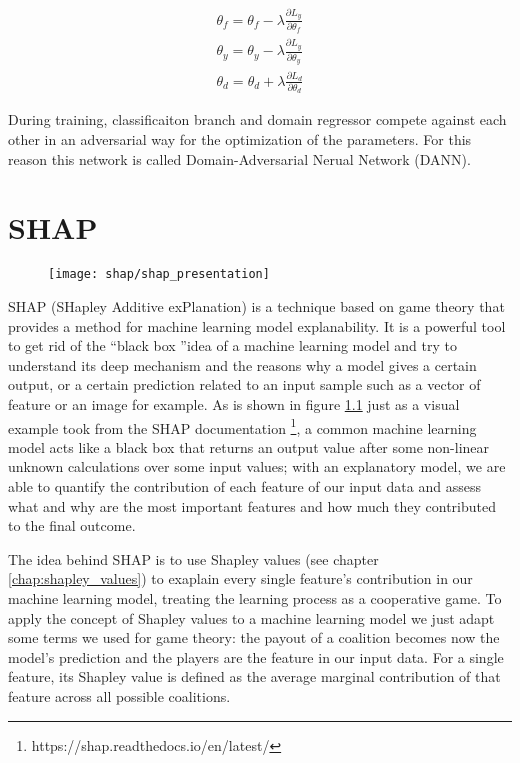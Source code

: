 \documentclass[11pt]{report}
\begin{document}
\begin{equation}
\begin{split}
 \theta_f = \theta_f - \lambda \frac{\partial L_y}{\partial \theta_f} \\
 \theta_y = \theta_y - \lambda \frac{\partial L_y}{\partial \theta_y} \\
\theta_d = \theta_d + \lambda \frac{\partial L_d}{\partial \theta_d}
\end{split}
\end{equation}

During training, classificaiton branch and domain regressor compete against each other in an adversarial way for the optimization of the parameters. For this reason this network is called Domain-Adversarial Nerual Network (DANN).



\chapter{SHAP}\label{chap:shap}


\begin{figure}[h]
\centering
\texttt{[image: shap/shap\_presentation]}
\caption{}\label{fig:shap_waterfall_example}
\end{figure}


SHAP (SHapley Additive exPlanation) is a technique based on game theory that provides a method for machine learning model explanability.
It is a powerful tool to get rid of the \textquotedblleft black box \textquotedblright idea of a machine learning model and try to understand its deep mechanism and the reasons why a model gives a certain output, or a certain prediction related to an input sample such as a vector of feature or an image for example.
As is shown in figure \ref{fig:shap_waterfall_example} just as a visual example took from the SHAP documentation \footnote{https://shap.readthedocs.io/en/latest/}, a common machine learning model acts like a black box that returns an output value after some non-linear unknown calculations over some input values; with an explanatory model, we are able to quantify the contribution of each feature of our input data and assess what and why are the most important features and how much they contributed to the final outcome.

The idea behind SHAP is to use Shapley values (see chapter \ref{chap:shapley_values}) to exaplain every single feature's contribution in our machine learning model, treating the learning process as a cooperative game.
To apply the concept of Shapley values to a machine learning model we just adapt some terms we used for game theory: the payout of a coalition becomes now the model's prediction and the players are the feature in our input data.
For a single feature, its Shapley value is defined as the average marginal contribution of that feature across all possible coalitions.
\end{document}
